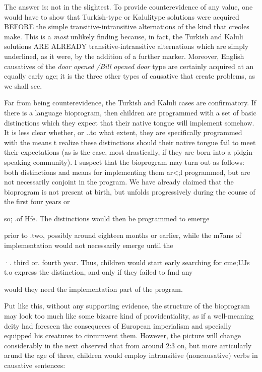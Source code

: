 The answer is: not in the slightest. To provide counterevidence of any value, one would have to show that Turkish-type or Kaluli\-type solutions were acquired BEFORE the simple transitive-intransitive alternations of the kind that creoles make. This is a \textit{most} unlikely finding because, in fact, the Turkish and Kaluli solutions ARE AL\-READY transitive-intransitive alternations which are simply under\-lined, as it were, by the addition of a further marker. Moreover, English causatives of the \textit{door} \textit{opened} \textit{/Bill} \textit{opened} \textit{door} type are certainly acquired at an equally early age; it is the three other types of causative that create problems, as we shall see.

Far from being counterevidence, the Turkish and Kaluli cases are confirmatory. If there is a language bioprogram, then children are programmed with a set of basic distinctions which they expect that their native tongue will implement somehow. It is less clear whether, or ..to what extent, they are specifically programmed with the means t realize these distinctions should their native tongue fail to meet their expectations (as is the case, most drastically, if they are born into a pidgin-speaking community). I suspect that the bioprogram may turn out as follows: both distinctions and means for implementing them ar{\textless};l programmed, but are not necessarily conjoint in the program. We have already claimed that the bioprogram is not present at birth, but unfolds progressively during the course of the first four years or

so; .of Hfe. The distinctions would then be programmed to emerge

prior to .two, possibly around eighteen months or earlier, while the m7ans of implementation would not necessarily emerge until the

·. third or. fourth year. Thus, children would start early searching for cme;UJs t.o express the distinction, and only if they failed to fmd any


would they need the implementation part of the program.

% 

Put like this, without any supporting evidence, the structure of the bioprogram may look too much like some bizarre kind of provi\-dentiality, as if a well-meaning deity had foreseen the consequeces of European imperialism and specially equipped his creatures to circum\-vent them. However, the picture will change considerably in the next
\citet{Bowerman1974} observed that from around 2:3 on, but more
articularly arund the age of three, children would employ intransitive (noncausative) verbs in causative sentences:

